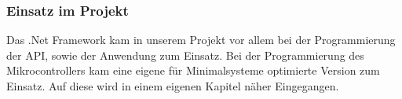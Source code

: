 \subsubsection{Einsatz im Projekt}
Das .Net Framework kam in unserem Projekt vor allem bei der Programmierung der API, sowie der Anwendung zum Einsatz. Bei der Programmierung des Mikrocontrollers kam eine eigene für Minimalsysteme optimierte Version zum Einsatz. Auf diese wird in einem eigenen Kapitel näher Eingegangen.

